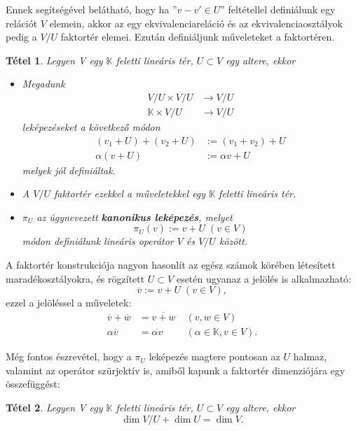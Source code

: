 \documentclass[oneside, titlepage, 12pt, a4paper]{report}
\newtheorem{theorem}{Tétel}[section]
\begin{document}
Ennek segítségével belátható, hogy ha  ''$v - v' \in U$'' feltétellel definiálunk egy relációt $V$ elemein, akkor az egy ekvivalenciareláció és az ekvivalenciaosztályok pedig a $V / U$ faktortér elemei. Ezután definiáljunk műveleteket a faktortéren.
\begin{theorem}
Legyen V egy $\mathbb{K}$ feletti lineáris tér, $U \subset V$ egy altere, ekkor
\begin{itemize}
\item
Megadunk	%
\begin{align*}
V / U \times V / U & \longrightarrow V / U \\
\mathbb{K} \times V / U & \longrightarrow V / U
\end{align*}
leképezéseket a következő módon
\begin{align}
(v_1 + U) + (v_2 + U) &:= (v_1 + v_2) + U \\
\alpha (v + U) &:= \alpha v + U
\end{align}
melyek jól definiáltak.
\item
A $V / U$ faktortér ezekkel a műveletekkel egy $\mathbb{K}$ feletti lineáris tér.
\item
$\pi_U$ az úgynevezett \textbf{kanonikus leképezés}, melyet
\begin{equation*}
\pi_U(v) := v + U \; (v \in V)
\end{equation*}
módon definiálunk lineáris operátor $V$ és $V / U$ között.
\end{itemize}
\end{theorem}

A faktortér konstrukciója nagyon hasonlít az egész számok körében létesített maradékosztályokra, és rögzített $U \subset V$ esetén ugyanaz a jelölés is alkalmazható:
\begin{equation*}
\overline{v} := v + U \; (v \in V),
\end{equation*}
ezzel a jelöléssel a műveletek:
\begin{align*}
\overline{v} + \overline{w} &= \overline{v + w} \; &(v, w \in V) \\
\alpha \overline{v} &= \overline{\alpha v} \; &(\alpha \in \mathbb{K}, v \in V).
\end{align*}

Még fontos észrevétel, hogy a $\pi_U$ leképezés magtere pontosan az $U$ halmaz, valamint az operátor szürjektív is, amiből kapunk a faktortér dimenziójára egy összefüggést:
\begin{theorem}
Legyen V egy $\mathbb{K}$ feletti lineáris tér, $U \subset V$ egy altere, ekkor
\begin{equation}
\dim V / U + \dim U = \dim V.
\end{equation}
\end{theorem}
\end{document}
